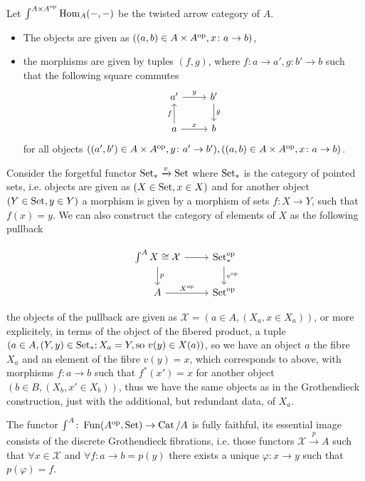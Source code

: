 \begin{exmp}	
	Let $ \int^{ A \times A^{ \operatorname{op} }} \operatorname{Hom}_A ( - , - ) $ be the twisted arrow category of $ A $.
	\begin{itemize}
		\item 
		The objects are given as $ ( ( a , b ) \in  A \times A^{\operatorname{op}}, x \colon a \to b ) $,
		
		\item 
		the morphisms are given by tuples $ ( f , g ) $, where $ f \colon a \to a' , g \colon b' \to b $ such that the following square commutes
		\[
		\begin{tikzcd}	
			a'
			\ar[r, " y " ]
			&
			b'
			\ar[d, " g "]
			\\
			a 
			\ar[ u , " f" ]
			\ar[r, " x" ]
			&
			b
		\end{tikzcd}
		\]
		for all objects $ ( ( a' , b' ) \in A \times A^{ \operatorname{op} } , y \colon a' \to b' ), ( ( a , b ) \in A \times A^{ \operatorname{op} }, x \colon a \to b )$.
	\end{itemize}

	Consider the forgetful functor $ \operatorname{Set}_* \xrightarrow{ v } \operatorname{Set} $ where $ \operatorname{Set}_* $ is the category of pointed sets, i.e. objects are given as $ ( X \in \operatorname{Set}, x \in X ) $ and for another object $ ( Y \in \operatorname{Set}, y \in Y ) $ a morphism is given by a morphism of sets $ f \colon X \to Y $, such that $ f ( x ) = y $.
	We can also construct the category of elements of $ X $ as the following pullback
	
	\[
	\begin{tikzcd}
		\int^A X \cong \mathcal{ X }
		\ar[d, " p " ]
		\ar[r]
		&
		\Set_*^{ \op }
		\ar[d, " v^{ \op } "]
		\\
		A
		\ar[r, " X^{ \op } "]
		&
		\Set^{ \op }
	\end{tikzcd}
	\]
	
	the objects of the pullback are given as $ \mathcal{ X } = ( a \in A , ( X_a, x \in X_a )) $, or more explicitely, in terms of the object of the fibered product, a tuple $ ( a \in  A , ( Y , y ) \in \operatorname{Set}_* ; X_a = Y, \text{so } v ( y ) \in X ( a ) ) $, so we have an object $ a $ the fibre $ X_a $ and an element of the fibre $ v ( y ) = x $, which corresponds to above, 
	with morphisms $ f\colon a \to b $ such that $ f^* ( x' ) = x $ for another object $ ( b \in B , ( X_b , x' \in X_b ))$, thus we have the same objects as in the Grothendieck construction, just with the additional, but redundant data, of $ X_a $.
\end{exmp}


\begin{thm}
	The functor $ \int^A \colon \operatorname{Fun} ( A^{ \operatorname{op} } , \operatorname{Set} ) \to \operatorname{Cat}/A $ is fully faithful,
	its essential image consists of the discrete Grothendieck fibrations, i.e. those functors 
	$ \mathcal{ X } \xrightarrow{ p } A $ such that $ \forall x \in \mathcal{ X } $ and $ \forall f \colon a \to b = p ( y) $ there exists a unique $ \varphi \colon x \to y  $ such that $ p( \varphi ) = f $.
\end{thm} 

